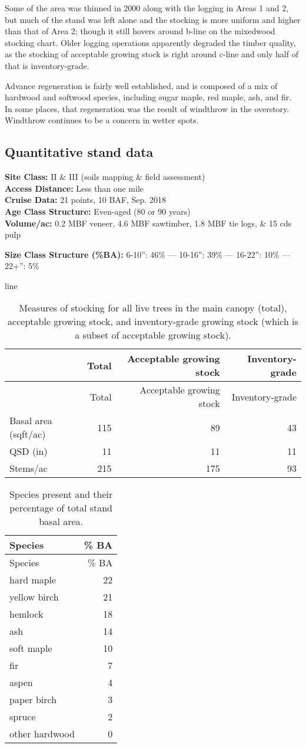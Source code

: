 \documentclass[]{tufte-handout}
\begin{document}
Some of the area was thinned in 2000 along with the logging in Areas 1
and 2, but much of the stand was left alone and the stocking is more
uniform and higher than that of Area 2; though it still hovers around
b-line on the mixedwood stocking chart. Older logging operations
apparently degraded the timber quality, as the stocking of acceptable
growing stock is right around c-line and only half of that is
inventory-grade.

Advance regeneration is fairly well established, and is composed of a
mix of hardwood and softwood species, including sugar maple, red maple,
ash, and fir. In some places, that regeneration was the result of
windthrow in the overstory. Windthrow continues to be a concern in
wetter spots.

\subsection{Quantitative stand data}\label{quantitative-stand-data-2}

\textbf{Site Class: } II \& III (soils mapping \& field assessment)\\
\textbf{Access Distance: } Less than one mile\\
\textbf{Cruise Data: } 21 points, 10 BAF, Sep. 2018\\
\textbf{Age Class Structure: } Even-aged (80 or 90 years)\\
\textbf{Volume/ac: } 0.2 MBF veneer, 4.6 MBF sawtimber, 1.8 MBF tie
logs, \& 15 cds pulp

\textbf{Size Class Structure (\%BA): } 6-10'': 46\% --- 10-16'': 39\%
--- 16-22'': 10\% --- 22+'': 5\%

line

\begin{longtable}[]{@{}lrrr@{}}
\caption{Measures of stocking for all live trees in the main canopy
(total), acceptable growing stock, and inventory-grade growing stock
(which is a subset of acceptable growing stock).}\tabularnewline
\toprule
& Total & Acceptable growing stock & Inventory-grade\tabularnewline
\midrule
\endfirsthead
\toprule
& Total & Acceptable growing stock & Inventory-grade\tabularnewline
\midrule
\endhead
Basal area (sqft/ac) & 115 & 89 & 43\tabularnewline
QSD (in) & 11 & 11 & 11\tabularnewline
Stems/ac & 215 & 175 & 93\tabularnewline
\bottomrule
\end{longtable}

\begin{longtable}[]{@{}lr@{}}
\caption{Species present and their percentage of total stand basal
area.}\tabularnewline
\toprule
Species & \% BA\tabularnewline
\midrule
\endfirsthead
\toprule
Species & \% BA\tabularnewline
\midrule
\endhead
hard maple & 22\tabularnewline
yellow birch & 21\tabularnewline
hemlock & 18\tabularnewline
ash & 14\tabularnewline
soft maple & 10\tabularnewline
fir & 7\tabularnewline
aspen & 4\tabularnewline
paper birch & 3\tabularnewline
spruce & 2\tabularnewline
other hardwood & 0\tabularnewline
\bottomrule
\end{longtable}
\end{document}
